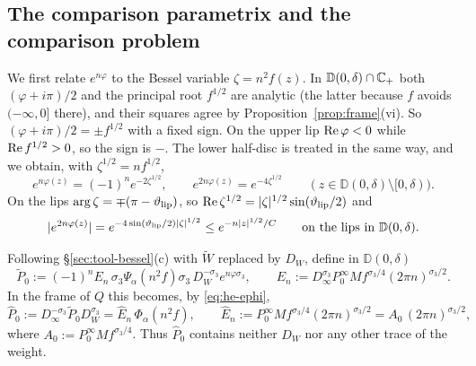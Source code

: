 \subsection{The comparison parametrix and the comparison problem}\label{sec:he-comparison}

We first relate $e^{n\varphi}$ to the Bessel variable $\zeta=n^2f(z)$. In $\mathbb D(0,\delta)\cap\mathbb{C}_+$ both $(\varphi+i\pi)/2$ and
the principal root $f^{1/2}$ are analytic (the latter because $f$ avoids $(-\infty,0]$ there), and their squares agree
by Proposition~\ref{prop:frame}(vi). So $(\varphi+i\pi)/2=\pm f^{1/2}$ with a fixed sign. On the upper lip $\operatorname{Re}\varphi<0$ while $\operatorname{Re} f^{1/2}>0$, so the
sign is $-$. The lower half-disc is treated in the same way, and we obtain, with $\zeta^{1/2}=nf^{1/2}$,
\begin{equation}\label{eq:he-ephi}
  e^{n\varphi(z)}=(-1)^ne^{-2\zeta^{1/2}},\qquad e^{2n\varphi(z)}=e^{-4\zeta^{1/2}}\qquad(z\in \mathbb D(0,\delta)\setminus[0,\delta)).
\end{equation}
On the lips $\arg\zeta=\mp(\pi-\vartheta_{\mathrm{lip}})$, so $\operatorname{Re}\zeta^{1/2}=|\zeta|^{1/2}\sin(\vartheta_{\mathrm{lip}}/2)$ and
\begin{equation}\label{eq:he-localisation}
  |e^{2n\varphi(z)}|=e^{-4\sin(\vartheta_{\mathrm{lip}}/2)|\zeta|^{1/2}}\le e^{-n|z|^{1/2}/C}\qquad\text{on the lips in }\mathbb D(0,\delta).
\end{equation}

Following \S\ref{sec:tool-bessel}(c) with $\tilde W$ replaced by $D_W$, define in $\mathbb D(0,\delta)$
\begin{equation}\label{eq:he-P0}
  \tilde P_0:=(-1)^nE_n\,\sigma_3\Psi_\alpha(n^2f)\sigma_3\,D_W^{-\sigma_3}e^{n\varphi\sigma_3},\qquad
  E_n:=D_\infty^{\sigma_3}P^\infty_0 Mf^{\sigma_3/4}(2\pi n)^{\sigma_3/2}.
\end{equation}
In the frame of $Q$ this becomes, by \eqref{eq:he-ephi},
\begin{equation}\label{eq:he-P0hat}
  \hat P_0:=D_\infty^{-\sigma_3}\tilde P_0D_W^{\sigma_3}=\hat E_n\,\Phi_\alpha(n^2f),\qquad
  \hat E_n:=P^\infty_0 Mf^{\sigma_3/4}(2\pi n)^{\sigma_3/2}=A_0\,(2\pi n)^{\sigma_3/2},
\end{equation}
where $A_0:=P^\infty_0 Mf^{\sigma_3/4}$. Thus $\hat P_0$ contains neither $D_W$ nor any other trace of the weight.


